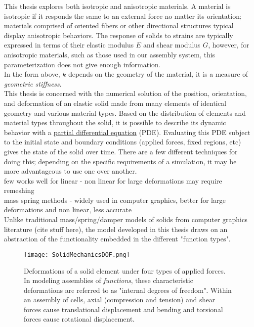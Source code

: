 {This thesis explores both isotropic and anisotropic materials.  A material is isotropic if it responds the same to an external force no matter its orientation; materials comprised of oriented fibers or other directional structures typical display anisotropic behaviors.  The response of solids to strains are typically expressed in terms of their elastic modulus $E$ and shear modulus $G$, however, for anisotropic materials, such as those used in our assembly system, this parameterization does not give enough information.\\

In the form above, $k$ depends on the geometry of the material, it is a measure of \textit{geometric stiffness}.\\






This thesis is concerned with the numerical solution of the position, orientation, and deformation of an elastic solid made from many elements of identical geometry and various material types.  Based on the distribution of elements and material types throughout the solid, it is possible to describe its dynamic behavior with a \href{https://en.wikipedia.org/wiki/Partial_differential_equation}{partial differential equation} (PDE).  Evaluating this PDE subject to the initial state and boundary conditions (applied forces, fixed regions, etc) gives the state of the solid over time.  There are a few different techniques for doing this; depending on the specific requirements of a simulation, it may be more advantageous to use one over another.\\


few works well for linear - non linear for large deformations may require remeshing\\
mass spring methods - widely used in computer graphics, better for large deformations and non linear, less accurate\\

Unlike traditional mass/spring/damper models of solids from computer graphics literature (cite stuff here), the model developed in this thesis draws on an abstraction of the functionality embedded in the different "function types".\\

\begin{figure}
  \texttt{[image: SolidMechanicsDOF.png]}
  \caption{Deformations of a solid element under four types of applied forces.  In modeling assemblies of \textit{functions}, these characteristic deformations are referred to as "internal degrees of freedom".  Within an assembly of cells, axial (compression and tension) and shear forces cause translational displacement and bending and torsional forces cause rotational displacement.}
  \label{fig:SolidMechanicsDOF}
\end{figure}

}
